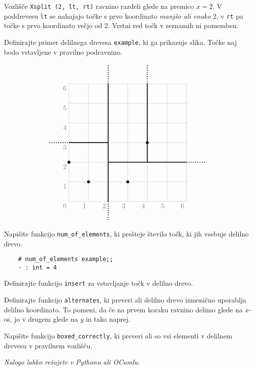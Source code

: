 \documentclass[arhiv]{../izpit}
\begin{document}
  Vozlišče \verb|Xsplit (2, lt, rt)| ravnino razdeli glede na premico $x=2$. V poddrevesu \verb|lt| se nahajajo točke s prvo koordinato \emph{manjšo ali enako} 2, v \verb|rt| pa točke s prvo koordinato večjo od 2. Vrstni red točk v seznamih ni pomemben.
	
  \podnaloga Definirajte primer delilnega drevesa \verb|example|, ki ga prikazuje slika. Točke naj bodo vstavljene v pravilno podravnino.
	
	\[
    \begin{tikzpicture}

    \draw[very thick, dotted] (2,0) -- (2,-1);
    \draw[very thick, dotted] (2,6) -- (2,7);
    \draw[very thick, dotted] (-1,3) -- (0,3);
    \draw[very thick, dotted] (6,2) -- (7,2);
    \draw[very thick, dotted] (4,6) -- (4,7);

    \foreach \i in {0,...,6} {
        \draw [very thin,gray] (\i,0) -- (\i,6)  node [below left] at (\i,0) {$\i$};
    }
    \draw [very thin,gray] (0,0) -- (6,0);
    \foreach \i in {1,...,6} {
        \draw [very thin,gray] (0,\i) -- (6,\i) node [below left] at (0,\i) {$\i$};
    }
	
    \draw[very thick] (2,0) -- (2,6);
    \draw[very thick] (0,3) -- (2,3);
    \draw[very thick] (2,2) -- (6,2);
    \draw[very thick] (4,2) -- (4,6);

    \filldraw[black] (1,1) circle (2pt);
    \filldraw[black] (0,2) circle (2pt);
    \filldraw[black] (3,1) circle (2pt);
    \filldraw[black] (4,3) circle (2pt);
  \end{tikzpicture}
  \]
	
  \podnaloga Napišite funkcijo \verb|num_of_elements|, ki prešteje število točk, ki jih vsebuje delilno drevo.
  \begin{verbatim}
	# num_of_elements example;;
	- : int = 4
	\end{verbatim}
	
  \podnaloga Definirajte funkcijo \verb|insert| za vstavljanje točk v delilno drevo.
    
  \podnaloga Definirajte funkcijo \verb|alternates|, ki preveri ali delilno drevo izmenično uporablja delilno koordinato. To pomeni, da če na prvem koraku ravnino delimo glede na $x$-os, jo v drugem glede na $y$ in tako naprej.

  \podnaloga Napišite funkcijo \verb|boxed_correctly|, ki preveri ali so vsi elementi v delilnem drevesu v pravilnem vozlišču. 

  \naloga
  
  \emph{Nalogo lahko rešujete v Pythonu ali OCamlu.}
\end{document}
